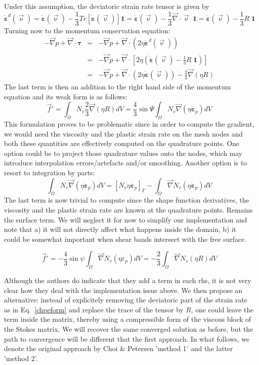 Under this assumption, the deviatoric strain rate tensor is given by
\[
\dot{\bm \varepsilon}^d(\vec\upnu)
= \dot{\bm \varepsilon}(\vec\upnu)- \frac{1}{3} Tr[\dot{\bm \varepsilon}(\vec\upnu)] {\bm 1}
= \dot{\bm \varepsilon}(\vec\upnu)- \frac{1}{3} \vec\nabla\cdot\vec\upnu \; {\bm 1}
= \dot{\bm \varepsilon}(\vec\upnu)- \frac{1}{3} R \; {\bm 1}
\]
Turning now to the momentum conservation equation:
\begin{eqnarray}
-\vec\nabla p + \vec\nabla \cdot {\bm \tau} 
&=& -\vec\nabla p + \vec\nabla \cdot (2 \eta \dot{\bm \varepsilon}^d(\vec\upnu)) \nonumber \\
&=& -\vec\nabla p + \vec\nabla \cdot \left[ 2 \eta \left(\dot{\bm \varepsilon}(\vec\upnu)- \frac{1}{3} R \; {\bm 1}\right) \right] \nonumber\\
&=& -\vec\nabla p 
+ \vec\nabla \cdot \left( 2 \eta \dot{\bm \varepsilon}(\vec\upnu)\right) -\frac{2}{3} \vec\nabla(\eta R) 
\label{chpeform}
\end{eqnarray}
The last term is then an addition to the right hand side of the momentum equation 
and its weak form is as follows:
\[
\vec f' 
= \int_\Omega N_v \frac{2}{3} \vec\nabla(\eta R) dV
= \frac{4}{3} \sin \Psi \int_\Omega N_v \vec\nabla(\eta \dot{\bm \varepsilon}_p) dV
\]
This formulation proves to be problematic since in order to compute the gradient, we would
need the viscosity and the plastic strain rate on the mesh nodes and both these quantities
are effectively computed on the quadrature points. One option could be to project those quadrature
values onto the nodes, which may introduce interpolation errors/artefacts and/or smoothing. 
Another option is to resort to integration by parts:
\[
\int_\Omega N_v \vec\nabla(\eta \dot{\bm \varepsilon}_p) dV
= \left[ N_v \eta \dot{\bm \varepsilon}_p \right]_\Gamma 
-\int_\Omega \vec\nabla N_v (\eta \dot{\bm \varepsilon}_p) dV
\]
The last term is now trivial to compute since the shape function derivatives, the viscosity
and the plastic strain rate are known at the quadrature points. Remains the surface term. 
We will neglect it for now to simplify our implementation and note that a) it will not directly 
affect what happens inside the domain, b) it could be somewhat important when shear bands
intersect with the free surface. 

\[
\vec f' 
=
-\frac{4}{3}\sin\psi\int_\Omega \vec\nabla N_v (\eta \dot{\varepsilon}_p) dV
=
-\frac{2}{3} \int_\Omega \vec\nabla N_v (\eta R) dV
\]

Although the authors do indicate that they add a term in each rhs, it is not very clear how they deal with
the implementation issue above. We then propose an alternative: instead of explicitely removing the deviatoric 
part of the strain rate as in Eq.~\ref{chpeform} and replace the trace of the tensor by $R$, one could 
leave the term inside the matrix, thereby using a compressible form of the viscous block of the Stokes 
matrix. We will recover the same converged solution as before, but the path to convergence will be 
different that the first approach.
In what follows, we denote the original approach by Choi \& Petersen 'method 1' and the latter 'method 2'.


